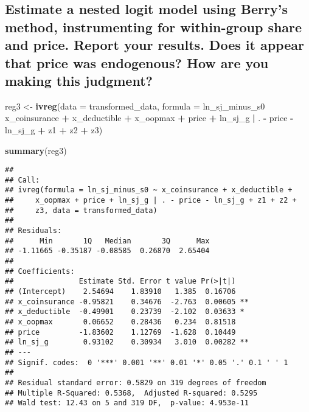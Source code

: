 \documentclass[]{article}
\newenvironment{Shaded}{\begin{snugshade}}{\end{snugshade}}
\newcommand{\DataTypeTok}[1]{\textcolor[rgb]{0.13,0.29,0.53}{#1}}
\newcommand{\KeywordTok}[1]{\textcolor[rgb]{0.13,0.29,0.53}{\textbf{#1}}}
\newcommand{\NormalTok}[1]{#1}
\newcommand{\OperatorTok}[1]{\textcolor[rgb]{0.81,0.36,0.00}{\textbf{#1}}}
\newcommand{\StringTok}[1]{\textcolor[rgb]{0.31,0.60,0.02}{#1}}
\begin{document}
\hypertarget{estimate-a-nested-logit-model-using-berrys-method-instrumenting-for-within-group-share-and-price.-report-your-results.-does-it-appear-that-price-was-endogenous-how-are-you-making-this-judgment}{%
\subsection{Estimate a nested logit model using Berry's method,
instrumenting for within-group share and price. Report your results.
Does it appear that price was endogenous? How are you making this
judgment?}\label{estimate-a-nested-logit-model-using-berrys-method-instrumenting-for-within-group-share-and-price.-report-your-results.-does-it-appear-that-price-was-endogenous-how-are-you-making-this-judgment}}

\begin{Shaded}
\begin{Highlighting}[]
\NormalTok{reg3 <-}\StringTok{ }\KeywordTok{ivreg}\NormalTok{(}\DataTypeTok{data =}\NormalTok{ transformed_data, }
      \DataTypeTok{formula =}\NormalTok{ ln_sj_minus_s0 }\OperatorTok{~}\StringTok{ }\NormalTok{x_coinsurance }\OperatorTok{+}\StringTok{ }\NormalTok{x_deductible }\OperatorTok{+}\StringTok{ }\NormalTok{x_oopmax }\OperatorTok{+}\StringTok{ }\NormalTok{price }\OperatorTok{+}\StringTok{ }\NormalTok{ln_sj_g }\OperatorTok{|}\StringTok{ }\NormalTok{. }\OperatorTok{-}\StringTok{ }\NormalTok{price }\OperatorTok{-}\StringTok{ }\NormalTok{ln_sj_g }\OperatorTok{+}\StringTok{ }\NormalTok{z1 }\OperatorTok{+}\StringTok{ }\NormalTok{z2 }\OperatorTok{+}\StringTok{ }\NormalTok{z3)}

\KeywordTok{summary}\NormalTok{(reg3)}
\end{Highlighting}
\end{Shaded}

\begin{verbatim}
## 
## Call:
## ivreg(formula = ln_sj_minus_s0 ~ x_coinsurance + x_deductible + 
##     x_oopmax + price + ln_sj_g | . - price - ln_sj_g + z1 + z2 + 
##     z3, data = transformed_data)
## 
## Residuals:
##      Min       1Q   Median       3Q      Max 
## -1.11665 -0.35187 -0.08585  0.26870  2.65404 
## 
## Coefficients:
##               Estimate Std. Error t value Pr(>|t|)   
## (Intercept)    2.54694    1.83910   1.385  0.16706   
## x_coinsurance -0.95821    0.34676  -2.763  0.00605 **
## x_deductible  -0.49901    0.23739  -2.102  0.03633 * 
## x_oopmax       0.06652    0.28436   0.234  0.81518   
## price         -1.83602    1.12769  -1.628  0.10449   
## ln_sj_g        0.93102    0.30934   3.010  0.00282 **
## ---
## Signif. codes:  0 '***' 0.001 '**' 0.01 '*' 0.05 '.' 0.1 ' ' 1
## 
## Residual standard error: 0.5829 on 319 degrees of freedom
## Multiple R-Squared: 0.5368,  Adjusted R-squared: 0.5295 
## Wald test: 12.43 on 5 and 319 DF,  p-value: 4.953e-11
\end{verbatim}
\end{document}
